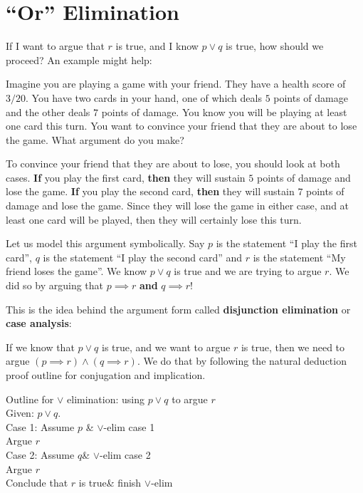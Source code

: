 \section{``Or'' Elimination}

If I want to argue that $r$ is true, and I know $p \vee q$ is true, how should we proceed?  An example might help:

\begin{xca}
	Imagine you are playing a game with your friend.  They have a health score of $3/20$.  You have two cards in your hand, one of which deals $5$ points of damage and the other deals $7$ points of damage.  You know you will be playing at least one card this turn.  You want to convince your friend that they are about to lose the game.  What argument do you make?
\end{xca}

\begin{solutions}
	To convince your friend that they are about to lose, you should look at both cases.  \textbf{If} you play the first card, \textbf{then} they will sustain $5$ points of damage and lose the game.  \textbf{If} you play the second card, \textbf{then} they will sustain $7$ points of damage and lose the game.  Since they will lose the game in either case, and at least one card will be played, then they will certainly lose this turn.
\end{solutions}

Let us model this argument symbolically.  Say $p$ is the statement ``I play the first card'', $q$ is the statement ``I play the second card'' and $r$ is the statement ``My friend loses the game''.  We know $p \vee q$ is true and we are trying to argue $r$.  We did so by arguing that $p \implies r$ \textbf{and} $q \implies r$!

This is the idea behind the argument form called \textbf{disjunction elimination} or  \textbf{case analysis}:

If we know that $p \vee q$ is true, and we want to argue $r$ is true, then we need to argue $(p \implies r) \wedge (q \implies r)$.   We do that by following the natural deduction proof outline for conjugation and implication. 

\begin{fitch*}
	\textrm{Outline for $\vee$ elimination:  using $p \vee q$ to argue $r$}\\
	 \hspace{1 cm}\textrm{Given: $p \vee q$.}\\
	\hspace{1 cm}\textrm{Case 1:  Assume $p$} & $\vee$-elim case 1\\
	\hspace{1 cm}\fa \textrm{Argue $r$}\\
	\hspace{1 cm}\textrm{Case 2:  Assume $q$}& $\vee$-elim case 2\\
	\hspace{1 cm}\fa \textrm{Argue $r$}\\
	\hspace{1 cm}\textrm{Conclude that $r$ is true}& finish $\vee$-elim
\end{fitch*}

